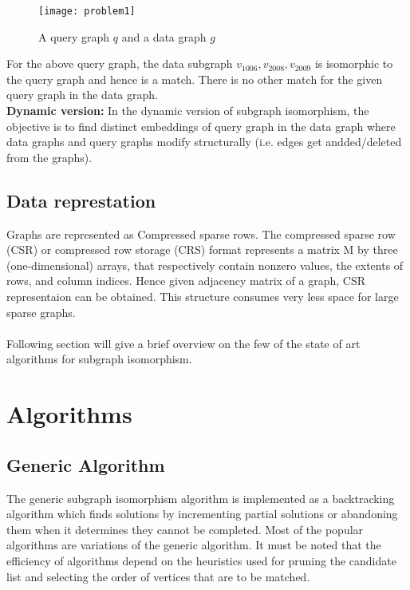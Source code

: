 \documentclass[
10pt, %
a4paper, %
oneside, %
headinclude,footinclude, %
BCOR5mm, %
]{scrartcl}
\begin{document}
\begin{figure}[h]
\centering 
\texttt{[image: problem1]} 
\caption[Subgraph Isomorphism]{A query graph $q$ and a data graph $g$} %
\label{fig:gallery} 
\end{figure}

For the above query graph, the data subgraph {$v_{1006}, v_{2008}, v_{2009}$} is isomorphic to the query graph and hence is a match. There is no other match for the given query graph in the data graph.\\

\textbf{Dynamic version:} In the dynamic version of subgraph isomorphism, the objective is to find distinct embeddings of query graph in the data graph where data graphs and query graphs modify structurally (i.e. edges get andded/deleted from the graphs).

\subsection{Data represtation}
Graphs are represented as Compressed sparse rows. The compressed sparse row (CSR) or compressed row storage (CRS) format represents a matrix M by three (one-dimensional) arrays, that respectively contain nonzero values, the extents of rows, and column indices. Hence given adjacency matrix of a graph, CSR representaion can be obtained. This structure consumes very less space for large sparse graphs.\\
\\
Following section will give a brief overview on the few of the state of art algorithms for subgraph isomorphism.

\section{Algorithms}

\subsection{Generic Algorithm}

The generic subgraph isomorphism algorithm is implemented
as a backtracking algorithm which finds solutions
by incrementing partial solutions or abandoning them when
it determines they cannot be completed. Most of the popular algorithms are variations of the generic algorithm. It must be noted that the efficiency of algorithms depend on the heuristics used for pruning the candidate list and selecting the order of vertices that are to be matched.
\end{document}
